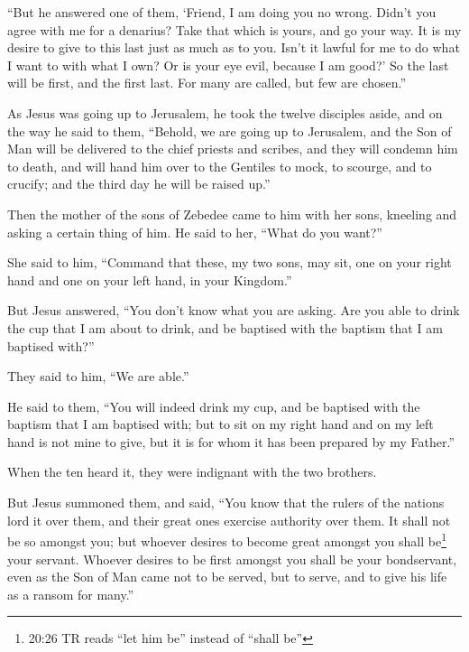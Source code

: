  ``But he answered one of them, `Friend, I am doing you no
wrong. Didn't you agree with me for a denarius?  Take that
which is yours, and go your way. It is my desire to give to this last
just as much as to you.  Isn't it lawful for me to do what
I want to with what I own? Or is your eye evil, because I am good?'
 So the last will be first, and the first last. For many
are called, but few are chosen.''

 As Jesus was going up to Jerusalem, he took the twelve
disciples aside, and on the way he said to them,  ``Behold,
we are going up to Jerusalem, and the Son of Man will be delivered to
the chief priests and scribes, and they will condemn him to death,
 and will hand him over to the Gentiles to mock, to
scourge, and to crucify; and the third day he will be raised up.''

 Then the mother of the sons of Zebedee came to him with
her sons, kneeling and asking a certain thing of him.  He
said to her, ``What do you want?''

She said to him, ``Command that these, my two sons, may sit, one on your
right hand and one on your left hand, in your Kingdom.''

 But Jesus answered, ``You don't know what you are asking.
Are you able to drink the cup that I am about to drink, and be baptised
with the baptism that I am baptised with?''

They said to him, ``We are able.''

 He said to them, ``You will indeed drink my cup, and be
baptised with the baptism that I am baptised with; but to sit on my
right hand and on my left hand is not mine to give, but it is for whom
it has been prepared by my Father.''

 When the ten heard it, they were indignant with the two
brothers.

 But Jesus summoned them, and said, ``You know that the
rulers of the nations lord it over them, and their great ones exercise
authority over them.  It shall not be so amongst you; but
whoever desires to become great amongst you shall be\footnote{20:26 TR
  reads ``let him be'' instead of ``shall be''} your servant.
 Whoever desires to be first amongst you shall be your
bondservant,  even as the Son of Man came not to be served,
but to serve, and to give his life as a ransom for many.''

